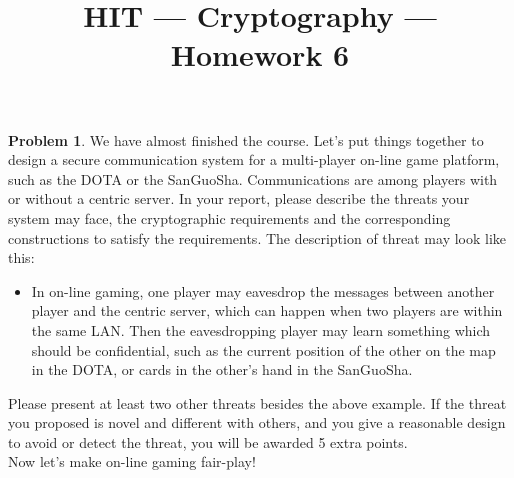 \documentclass[11pt]{article}
\title{HIT --- Cryptography --- Homework 6}
\theoremstyle{definition}
\newtheorem{problem}{Problem}
\begin{document}
\maketitle

\begin{problem}
We have almost finished the course. Let's put things together to design a secure communication system for  
a multi-player on-line game platform, such as the DOTA or the SanGuoSha. Communications are among players with or without a centric server.
In your report, please describe the threats your system may face, the cryptographic requirements and the corresponding constructions to satisfy the requirements. The description of threat may look like this:
\begin{itemize}
\item In on-line gaming, one player may eavesdrop the messages between another player and the centric server, which can happen when two players are within the same LAN. Then the eavesdropping player may learn something which should be confidential, such as the current position of the other on the map in  the DOTA, or cards in the other's hand in the SanGuoSha.
\end{itemize}
Please present at least two other threats besides the above example. If the threat you proposed is novel and different with others, and you give a reasonable design to avoid or detect the threat, you will be awarded 5 extra points.\\

Now let's make on-line gaming fair-play!
\end{problem}
\end{document}

